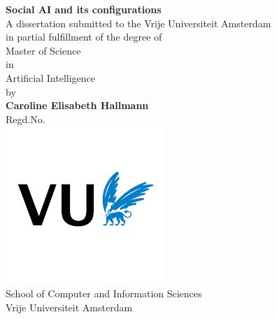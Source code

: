 \newpage
\thispagestyle{empty}
\begin{titlepage}
	\begin{center}
		\Huge{\textbf{ Social AI and its configurations}}
		\vspace{1cm}\\
		\normalsize A dissertation submitted to the Vrije Universiteit Amsterdam \\ in partial fulfillment of the degree of \\
		\vspace{1cm}
		\Large Master of Science \\ in \\ Artificial Intelligence \\
		\vspace{1cm}
		\large by \\
		\vspace{1cm}
		\textbf{Caroline Elisabeth Hallmann} \\
		\vspace{0.5cm}Regd.No. \\
		\vspace{1cm}
        \includegraphics[scale=0.7]{images/download.png} \\
        \vspace{0.5cm}
        \large School of Computer and Information Sciences \\
		Vrije Universiteit Amsterdam \\
		\vspace{0.5cm}
	\end{center}
\end{titlepage}
